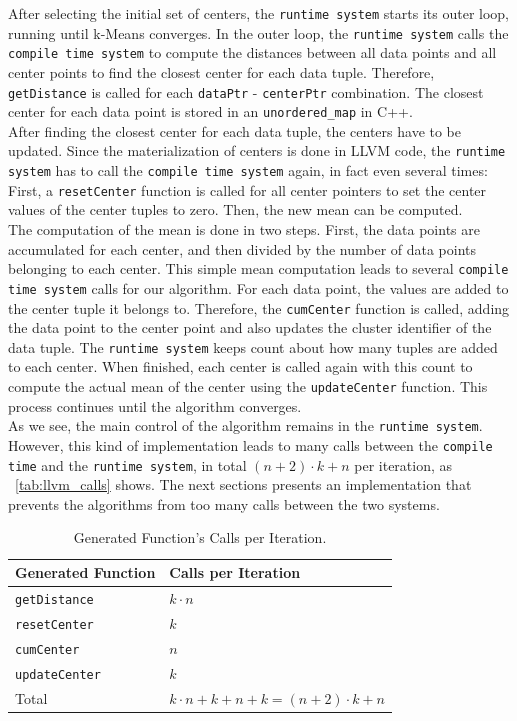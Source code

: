 After selecting the initial set of centers, the \texttt{runtime system} starts its outer loop, running until k-Means converges. In the outer loop, the \texttt{runtime system} calls the \texttt{compile time system} to compute the distances between all data points and all center points to find the closest center for each data tuple. Therefore, \texttt{getDistance} is called for each \texttt{dataPtr} - \texttt{centerPtr} combination. The closest center for each data point is stored in an \texttt{unordered\_map} in C++. 
\\
After finding the closest center for each data tuple, the centers have to be updated. Since the materialization of centers is done in LLVM code, the \texttt{runtime system} has to call the \texttt{compile time system} again, in fact even several times: First, a \texttt{resetCenter} function is called for all center pointers to set the center values of the center tuples to zero. Then, the new mean can be computed. 
\\
The computation of the mean is done in two steps. First, the data points are accumulated for each center, and then divided by the number of data points belonging to each center. This simple mean computation leads to several \texttt{compile time system} calls for our algorithm. For each data point, the values are added to the center tuple it belongs to. Therefore, the \texttt{cumCenter} function is called, adding the data point to the center point and also updates the cluster identifier of the data tuple. The \texttt{runtime system} keeps count about how many tuples are added to each center. When finished, each center is called again with this count to compute the actual mean of the center using the \texttt{updateCenter} function. This process continues until the algorithm converges.
\\
As we see, the main control of the algorithm remains in the \texttt{runtime system}. However, this kind of implementation leads to many calls between the \texttt{compile time} and the \texttt{runtime system}, in total $(n+2) \cdot k + n$ per iteration, as ~\autoref{tab:llvm_calls} shows. The next sections presents an implementation that prevents the algorithms from too many calls between the two systems.




\begin{table}[htsb]
  \caption[LLVM number of calls]{Generated Function's Calls per Iteration.}\label{tab:llvm_calls}
  \centering
  \begin{tabular}{l l}
    \toprule
      Generated Function & Calls per Iteration \\
    \midrule
      \texttt{getDistance} & $k \cdot n$ \\
      \texttt{resetCenter} & $k$ \\
      \texttt{cumCenter} & $n$ \\
      \texttt{updateCenter} & $k$ \\
    \bottomrule
      Total & $k \cdot n + k + n + k = (n + 2) \cdot k + n$ \\
  \end{tabular}
\end{table}


